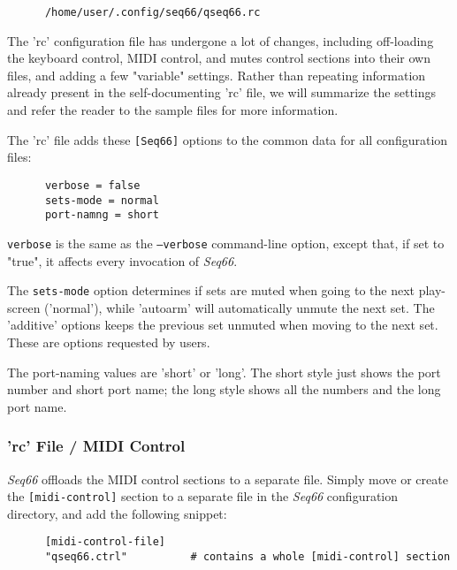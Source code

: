    \begin{verbatim}
      /home/user/.config/seq66/qseq66.rc
   \end{verbatim}

   The 'rc' configuration file has undergone a lot of changes, including
   off-loading the keyboard control, MIDI control, and mutes control sections
   into their own files, and adding a few "variable" settings.
   Rather than repeating information already present in the self-documenting
   'rc' file, we will summarize the settings and refer the reader to the sample
   files for more information.

   The 'rc' file adds these \texttt{[Seq66]} options to the common
   data for all configuration files:

   \begin{verbatim}
      verbose = false
      sets-mode = normal
      port-namng = short
   \end{verbatim}

   \texttt{verbose} is the same as the \texttt{--verbose} command-line option,
   except that, if set to "true", it affects every invocation of \textsl{Seq66}.

   The \texttt{sets-mode} option determines if sets are muted when going to the
   next play-screen ('normal'), while 'autoarm' will automatically
   unmute the next set.  The 'additive' options keeps the previous
   set unmuted when moving to the next set.  These are options requested by
   users.

  The port-naming values are 'short' or 'long'.  The short style
  just shows the port number and short port name; the long style
  shows all the numbers and the long port name.

\subsubsection{'rc' File / MIDI Control}
\label{subsubsec:configuration_rc_midi_control}

   \textsl{Seq66} offloads the MIDI control sections to a separate file.
   Simply move or create
   the \texttt{[midi-control]} section to a separate file in
   the \textsl{Seq66} configuration directory, and add the following
   snippet:

   \begin{verbatim}
      [midi-control-file]
      "qseq66.ctrl"          # contains a whole [midi-control] section
   \end{verbatim}

